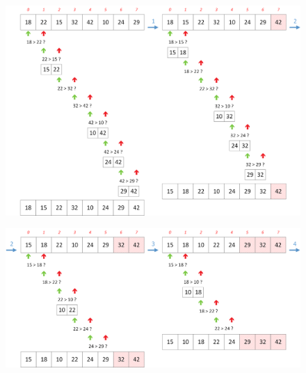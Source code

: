 \documentclass[11pt,a4paper]{article}
\begin{document}
\begin{figure}[ht!]
\centering
\centerline{
\includegraphics[width=1.2\textwidth]{img/tris/2_per_pages/BubbleSort_part1.png}
}
\end{figure}

\clearpage

\begin{figure}[ht!]
\centering
\centerline{
\includegraphics[width=1.2\textwidth]{img/tris/2_per_pages/BubbleSort_part2.png}
}
\end{figure}

\vfillFirst
\end{document}
